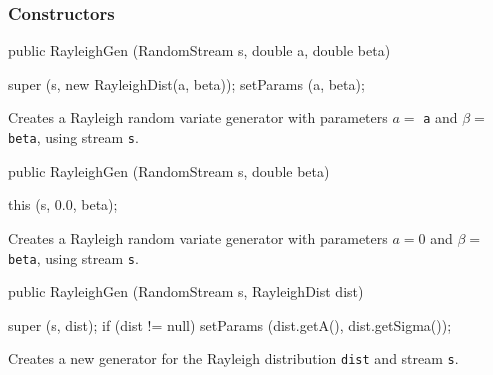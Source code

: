 \subsubsection* {Constructors}
\begin{code}

   public RayleighGen (RandomStream s, double a, double beta) \begin{hide} {
      super (s, new RayleighDist(a, beta));
      setParams (a, beta);
   }\end{hide}
\end{code}
\begin{tabb} Creates a Rayleigh random variate generator with parameters
 $a =$ \texttt{a} and $\beta =$ \texttt{beta}, using stream \texttt{s}.
\end{tabb}
\begin{code}

   public RayleighGen (RandomStream s, double beta) \begin{hide} {
      this (s, 0.0, beta);
   }\end{hide}
\end{code}
\begin{tabb} Creates a Rayleigh random variate generator with parameters
 $a = 0$ and $\beta = $ \texttt{beta}, using stream \texttt{s}.
\end{tabb}
\begin{code}

   public RayleighGen (RandomStream s, RayleighDist dist) \begin{hide} {
      super (s, dist);
      if (dist != null)
         setParams (dist.getA(), dist.getSigma());
   } \end{hide}
\end{code}
\begin{tabb} Creates a new generator for the Rayleigh distribution \texttt{dist}
   and stream \texttt{s}.
\end{tabb}

